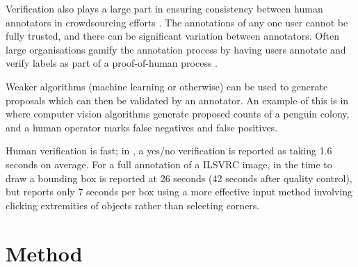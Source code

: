 \documentclass[conference]{IEEEtran}
\begin{document}
Verification also plays a large part in ensuring consistency between human annotators in crowdsourcing efforts \cite{Su2012a}. The annotations of any one user cannot be fully trusted, and there can be significant variation between annotators. Often large organisations gamify the annotation process by having users annotate and verify labels as part of a proof-of-human process \cite{von2008recaptcha}.

Weaker algorithms (machine learning or otherwise) can be used to generate proposals which can then be validated by an annotator. An example of this is in \cite{McNeill2011} where computer vision algorithms generate proposed counts of a penguin colony, and a human operator marks false negatives and false positives.

Human verification is fast; in \cite{Papadopoulos2016}, a yes/no verification is reported as taking 1.6 seconds on average. For a full annotation of a \gls{ILSVRC} image, in \cite{Su2012a} the time to draw a bounding box is reported at 26 seconds (42 seconds after quality control), but \cite{Papadopoulos2017} reports only 7 seconds per box using a more effective input method involving clicking extremities of objects rather than selecting corners. 



\section{Method}
\end{document}
